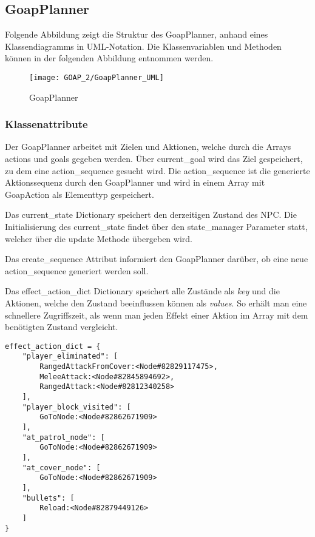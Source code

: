 



\subsection{GoapPlanner}

Folgende Abbildung zeigt die Struktur des GoapPlanner, anhand eines Klassendiagramms in UML-Notation. Die Klassenvariablen und Methoden können in der folgenden Abbildung entnommen werden.

\begin{figure}[h]
  \centering
  \texttt{[image: GOAP\_2/GoapPlanner\_UML]}
	\captionsetup{justification=justified, format=plain}
  \caption{GoapPlanner}
  \label{GoapPlanner}
\end{figure}


\subsubsection{Klassenattribute}

Der GoapPlanner arbeitet mit Zielen und Aktionen, welche durch die Arrays actions und goals gegeben werden. Über current\_goal wird das Ziel gespeichert, zu dem eine action\_sequence gesucht wird. Die action\_sequence ist die generierte Aktionssequenz durch den GoapPlanner und wird in einem Array mit GoapAction als Elementtyp gespeichert. 

Das current\_state Dictionary speichert den derzeitigen Zustand des NPC. Die Initialisierung des current\_state findet über den state\_manager Parameter statt, welcher über die update Methode übergeben wird.

Das create\_sequence Attribut informiert den GoapPlanner darüber, ob eine neue action\_sequence generiert werden soll.

Das effect\_action\_dict Dictionary speichert alle Zustände als \textit{key} und die Aktionen, welche den Zustand beeinflussen können als \textit{values}. So erhält man eine schnellere Zugriffszeit, als wenn man jeden Effekt einer Aktion im Array mit dem benötigten Zustand vergleicht.

\begin{lstlisting}[language=dict, caption={effect\_action\_dict aus der Implementierung}]
effect_action_dict = {
    "player_eliminated": [
        RangedAttackFromCover:<Node#82829117475>,
        MeleeAttack:<Node#82845894692>,
        RangedAttack:<Node#82812340258>
    ],
    "player_block_visited": [
        GoToNode:<Node#82862671909>
    ],
    "at_patrol_node": [
        GoToNode:<Node#82862671909>
    ],
    "at_cover_node": [
        GoToNode:<Node#82862671909>
    ],
    "bullets": [
        Reload:<Node#82879449126>
    ]
}
\end{lstlisting}


